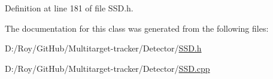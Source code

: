 Definition at line 181 of file S\+S\+D.\+h.



The documentation for this class was generated from the following files\+:\begin{DoxyCompactItemize}
\item 
D\+:/\+Roy/\+Git\+Hub/\+Multitarget-\/tracker/\+Detector/\mbox{\hyperlink{_s_s_d_8h}{S\+S\+D.\+h}}\item 
D\+:/\+Roy/\+Git\+Hub/\+Multitarget-\/tracker/\+Detector/\mbox{\hyperlink{_s_s_d_8cpp}{S\+S\+D.\+cpp}}\end{DoxyCompactItemize}
